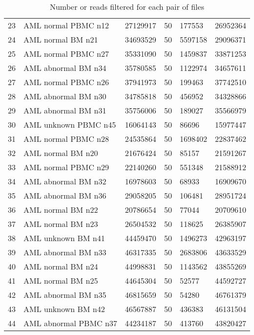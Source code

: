 \documentclass[a4paper]{article}
\begin{document}
\begin{table}[ht]
\begin{tabular}{rlllll}
  23 & AML normal PBMC n12 & 27129917 & 50 & 177553 & 26952364 \\ 
  24 & AML normal BM n21 & 34693529 & 50 & 5597158 & 29096371 \\ 
  25 & AML normal PBMC n27 & 35331090 & 50 & 1459837 & 33871253 \\ 
  26 & AML abnormal BM n34 & 35780585 & 50 & 1122974 & 34657611 \\ 
  27 & AML normal PBMC n26 & 37941973 & 50 & 199463 & 37742510 \\ 
  28 & AML abnormal BM n30 & 34785818 & 50 & 456952 & 34328866 \\ 
  29 & AML abnormal BM n31 & 35756006 & 50 & 189027 & 35566979 \\ 
  30 & AML unknown PBMC n45 & 16064143 & 50 & 86696 & 15977447 \\ 
  31 & AML normal PBMC n28 & 24535864 & 50 & 1698402 & 22837462 \\ 
  32 & AML normal BM n20 & 21676424 & 50 & 85157 & 21591267 \\ 
  33 & AML normal PBMC n29 & 22140260 & 50 & 551348 & 21588912 \\ 
  34 & AML abnormal BM n32 & 16978603 & 50 & 68933 & 16909670 \\ 
  35 & AML abnormal BM n36 & 29058205 & 50 & 106481 & 28951724 \\ 
  36 & AML normal BM n22 & 20786654 & 50 & 77044 & 20709610 \\ 
  37 & AML normal BM n23 & 26504532 & 50 & 118625 & 26385907 \\ 
  38 & AML unknown BM n41 & 44459470 & 50 & 1496273 & 42963197 \\ 
  39 & AML abnormal BM n33 & 46317335 & 50 & 2683806 & 43633529 \\ 
  40 & AML normal BM n24 & 44998831 & 50 & 1143562 & 43855269 \\ 
  41 & AML normal BM n25 & 44645304 & 50 & 52577 & 44592727 \\ 
  42 & AML abnormal BM n35 & 46815659 & 50 & 54280 & 46761379 \\ 
  43 & AML unknown BM n42 & 46567887 & 50 & 436383 & 46131504 \\ 
  44 & AML abnormal PBMC n37 & 44234187 & 50 & 413760 & 43820427 \\ 
   \hline
\end{tabular}
\caption{Number or reads filtered for each pair of files} 
\label{listfiltered}
\end{table}
\end{document}
